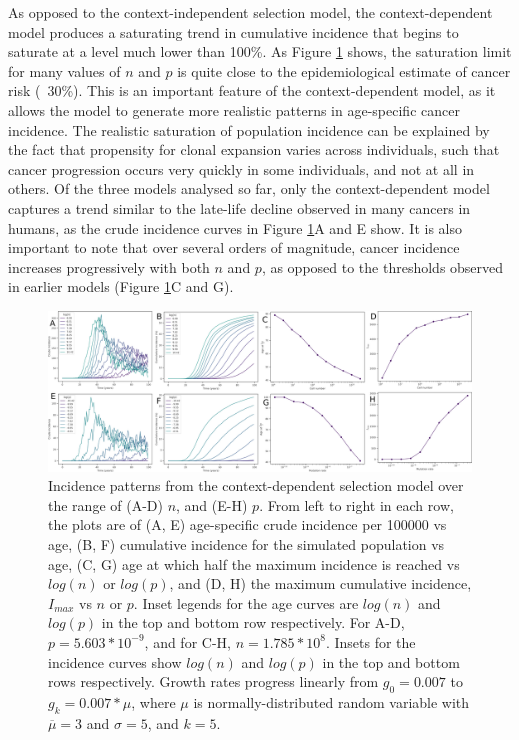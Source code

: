 \documentclass[9pt,onecolumn,twoside]{pnas-new}
\begin{document}
As opposed to the context-independent selection model, the context-dependent model produces a saturating trend in cumulative incidence that begins to saturate at a level much lower than 100\%. As Figure \ref{fig5} shows, the saturation limit for many values of $n$ and $p$ is quite close to the epidemiological estimate of cancer risk (~30\%). This is an important feature of the context-dependent model, as it allows the model to generate more realistic patterns in age-specific cancer incidence. The realistic saturation of population incidence can be explained by the fact that propensity for clonal expansion varies across individuals, such that cancer progression occurs very quickly in some individuals, and not at all in others. Of the three models analysed so far, only the context-dependent model captures a trend similar to the late-life decline observed in many cancers in humans, as the crude incidence curves in Figure \ref{fig5}A and E show. It is also important to note that over several orders of magnitude, cancer incidence increases progressively with both $n$ and $p$, as opposed to the thresholds observed in earlier models (Figure \ref{fig5}C and G).

\begin{figure}[tbhp]
	\centering
	\includegraphics[width=\linewidth]{fig5.png}
	\caption{Incidence patterns from the context-dependent selection model over the range of (A-D) $n$, and (E-H) $p$. From left to right in each row, the plots are of (A, E) age-specific crude incidence per 100000 vs age, (B, F) cumulative incidence for the simulated population vs age, (C, G) age at which half the maximum incidence is reached vs $log(n)$ or $log(p)$, and (D, H) the maximum cumulative incidence, $I_{max}$ vs $n$ or $p$. Inset legends for the age curves are $log(n)$ and $log(p)$ in the top and bottom row respectively. For A-D, $p=5.603*10^{-9}$, and for C-H, $n=1.785*10^{8}$. Insets for the incidence curves show $log(n)$ and $log(p)$ in the top and bottom rows respectively. Growth rates progress linearly from $g_{0}=0.007$ to $g_{k}=0.007*\mu$, where $\mu$ is normally-distributed random variable with $\overline{\mu}=3$ and $\sigma=5$, and $k=5$.}
	\label{fig5}
\end{figure}
\end{document}
